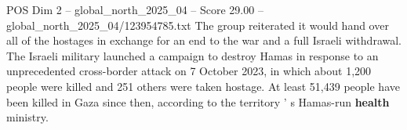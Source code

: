 \begin{textsample}{POS Dim 2 – global\_north\_2025\_04 – Score 29.00 – global\_north\_2025\_04/123954785.txt}
The group reiterated it would hand over all of the hostages in exchange for an end to the war and a full Israeli withdrawal.
The Israeli military launched a campaign to destroy Hamas in response to an unprecedented cross-border attack on 7 October 2023, in which about 1,200 people were killed and 251 others were taken hostage.
At least 51,439 people have been killed in Gaza since then, according to the territory ' s Hamas-run \textbf{health} ministry.

\end{textsample}
